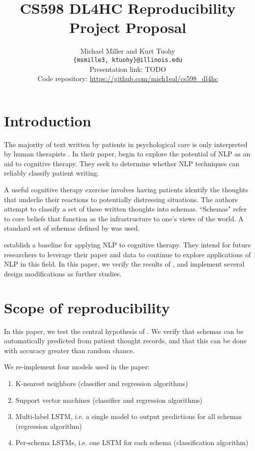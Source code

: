\documentclass[11pt,a4paper]{article}
\title{CS598 DL4HC Reproducibility Project Proposal}
\author{Michael Miller and Kurt Tuohy\\
  \texttt{\{msmille3, ktuohy\}@illinois.edu}
  \\[2em]
  Presentation link: TODO\url{} \\
  Code repository: \url{https://github.com/mich1eal/cs598_dl4hc} \citep{cs598_repo}}
\begin{document}
\maketitle


\section{Introduction}

The majority of text written by patients in psychological care is only interpreted by human therapists \citep{burger_2021}. In their paper, \citeauthor{burger_2021} begin to explore the potential of NLP as an aid to cognitive therapy. They seek to determine whether NLP techniques can reliably classify patient writing.

A useful cognitive therapy exercise involves having patients identify the thoughts that underlie their reactions to potentially distressing situations. The authors attempt to classify a set of these written thoughts into schemas. ``Schemas" refer to core beliefs that function as the infrastructure to one's views of the world. A standard set of schemas defined by \citeauthor{millings_2015} was used.

\citeauthor{burger_2021} establish a baseline for applying NLP to cognitive therapy. They intend for future researchers to leverage their paper and data to continue to explore applications of NLP in this field. In this paper, we verify the results of \citeauthor{burger_2021}, and implement several design modifications as further studies. 

\section{Scope of reproducibility}

In this paper, we test the central hypothesis of \citeauthor{burger_2021}. We verify that schemas can be automatically predicted from patient thought records, and that this can be done with accuracy greater than random chance.

We re-implement four models used in the paper:
\begin{enumerate}
    \item K-nearest neighbors (classifier and regression algorithms)
    \item Support vector machines (classifier and regression algorithms)
    \item Multi-label LSTM, i.e. a single model to output predictions for all schemas (regression algorithm)
    \item Per-schema LSTMs, i.e. one LSTM for each schema (classification algorithm)
\end{enumerate}
\end{document}
